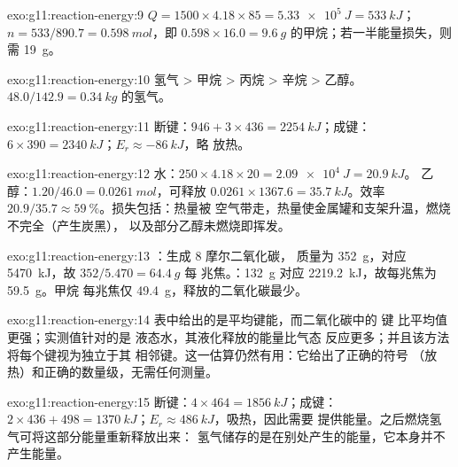 \begin{solution}{exo:g11:reaction-energy:9}
$Q = 1500 \times 4.18 \times 85 = \qty{5.33e5}{J} = \qty{533}{kJ}$；
$n = 533 / 890.7 = \qty{0.598}{mol}$，即 $0.598 \times 16.0 =
\qty{9.6}{g}$ 的甲烷；若一半能量损失，则需 \qty{19}{g}。
\end{solution}

\begin{solution}{exo:g11:reaction-energy:10}
氢气 > 甲烷 > 丙烷 > 辛烷 > 乙醇。
$48.0 / 142.9 = \qty{0.34}{kg}$ 的氢气。
\end{solution}

\begin{solution}{exo:g11:reaction-energy:11}
断键：$946 + 3 \times 436 = \qty{2254}{kJ}$；成键：
$6 \times 390 = \qty{2340}{kJ}$；$E_r \approx \qty{-86}{kJ}$，略
放热。
\end{solution}

\begin{solution}{exo:g11:reaction-energy:12}
水：$250 \times 4.18 \times 20 = \qty{2.09e4}{J} = \qty{20.9}{kJ}$。
乙醇：$1.20 / 46.0 = \qty{0.0261}{mol}$，可释放
$0.0261 \times 1367.6 = \qty{35.7}{kJ}$。效率
$20.9 / 35.7 \approx \qty{59}{\percent}$。损失包括：热量被
空气带走，热量使金属罐和支架升温，燃烧不完全（产生炭黑），
以及部分乙醇未燃烧即挥发。
\end{solution}

\begin{solution}{exo:g11:reaction-energy:13}
：生成 8 摩尔二氧化碳，
质量为 \qty{352}{g}，对应 \qty{5470}{kJ}，故 $352 / 5.470 = \qty{64.4}{g}$ 每
兆焦。：\qty{132}{g} 对应
\qty{2219.2}{kJ}，故每兆焦为 \qty{59.5}{g}。甲烷
每兆焦仅 \qty{49.4}{g}，释放的二氧化碳最少。
\end{solution}

\begin{solution}{exo:g11:reaction-energy:14}
表中给出的是平均键能，而二氧化碳中的  键
比平均值更强；实测值针对的是
液态水，其液化释放的能量比气态
反应更多；并且该方法将每个键视为独立于其
相邻键。这一估算仍然有用：它给出了正确的符号
（放热）和正确的数量级，无需任何测量。
\end{solution}

\begin{solution}{exo:g11:reaction-energy:15}
断键：$4 \times 464 = \qty{1856}{kJ}$；成键：$2 \times 436 + 498 =
\qty{1370}{kJ}$；$E_r \approx \qty{+486}{kJ}$，吸热，因此需要
提供能量。之后燃烧氢气可将这部分能量重新释放出来：
氢气储存的是在别处产生的能量，它本身并不产生能量。
\end{solution}

